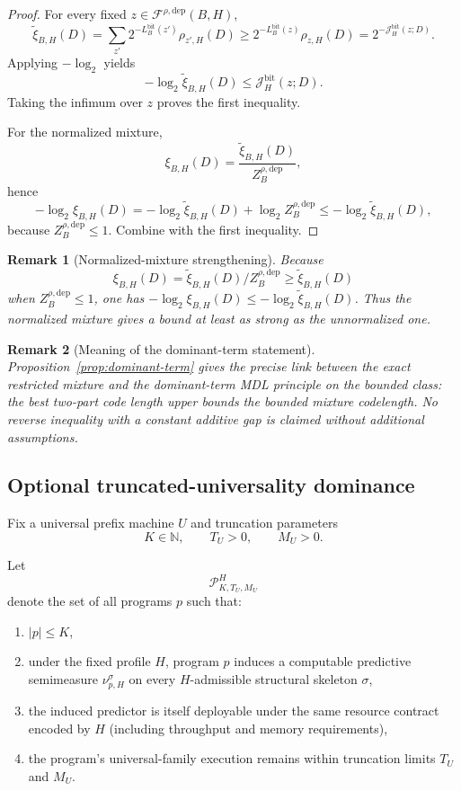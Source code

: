 \documentclass[11pt]{article}
\newtheorem{remark}{Remark}
\begin{document}
\begin{proof}
For every fixed
$z\in\mathcal{F}^{\rho,\mathrm{dep}}(B,H)$,
\[
\widetilde{\xi}_{B,H}(D)
=
\sum_{z'}2^{-L_B^{\mathrm{bit}}(z')}\rho_{z',H}(D)
\ge
2^{-L_B^{\mathrm{bit}}(z)}\rho_{z,H}(D)
=
2^{-\mathcal{J}_H^{\mathrm{bit}}(z;D)}.
\]
Applying $-\log_2$ yields
\[
-\log_2 \widetilde{\xi}_{B,H}(D)\le \mathcal{J}_H^{\mathrm{bit}}(z;D).
\]
Taking the infimum over $z$ proves the first inequality.

For the normalized mixture,
\[
\xi_{B,H}(D)=\frac{\widetilde{\xi}_{B,H}(D)}{Z_B^{\rho,\mathrm{dep}}},
\]
hence
\[
-\log_2 \xi_{B,H}(D)
=
-\log_2 \widetilde{\xi}_{B,H}(D)+\log_2 Z_B^{\rho,\mathrm{dep}}
\le
-\log_2 \widetilde{\xi}_{B,H}(D),
\]
because $Z_B^{\rho,\mathrm{dep}}\le 1$. Combine with the first inequality.
\end{proof}

\begin{remark}[Normalized-mixture strengthening]
Because
\[
\xi_{B,H}(D)=\widetilde{\xi}_{B,H}(D)/Z_B^{\rho,\mathrm{dep}}
\ge\widetilde{\xi}_{B,H}(D)
\]
when $Z_B^{\rho,\mathrm{dep}}\le 1$, one has
$-\log_2\xi_{B,H}(D)\le-\log_2\widetilde{\xi}_{B,H}(D)$.
Thus the normalized mixture gives a bound at least as strong as the
unnormalized one.
\end{remark}

\begin{remark}[Meaning of the dominant-term statement]
Proposition~\ref{prop:dominant-term} gives the precise link between the exact
restricted mixture and the dominant-term MDL principle on the bounded class:
the best two-part code length upper bounds the bounded mixture codelength. No
reverse inequality with a constant additive gap is claimed without additional
assumptions.
\end{remark}

\subsection{Optional truncated-universality dominance}

Fix a universal prefix machine $U$ and truncation parameters
\[
K\in\mathbb{N},
\qquad
T_U>0,
\qquad
M_U>0.
\]

Let
\[
\mathcal{P}_{K,T_U,M_U}^H
\]
denote the set of all programs $p$ such that:
\begin{enumerate}
    \item $|p|\le K$,
    \item under the fixed profile $H$, program $p$ induces a computable
    predictive semimeasure $\nu_{p,H}^{\sigma}$ on every $H$-admissible
    structural skeleton $\sigma$,
    \item the induced predictor is itself deployable under the same resource
    contract encoded by $H$ (including throughput and memory requirements),
    \item the program's universal-family execution remains within truncation
    limits $T_U$ and $M_U$.
\end{enumerate}
\end{document}
